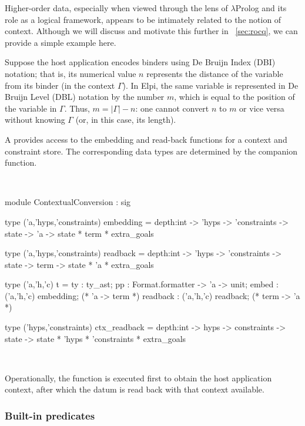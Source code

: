 \documentclass[a4paper, 11pt]{book}
\newenvironment{ocamlcode}
  {\VerbatimEnvironment~\\\begin{ocamlbox}\begin{xocamlcode}}{\end{xocamlcode}
\end{ocamlbox}\\}
\begin{document}
Higher-order data, especially when viewed through the lens of $\lambda$Prolog
and its role as a logical framework, appears to be intimately related to the
notion of context. Although we will discuss and motivate this further in
~\cref{sec:rocq}, we can provide a simple example here.

Suppose the host application encodes binders using De Bruijn Index (DBI)
notation; that is, its numerical value $n$ represents the distance of the
variable from its binder (in the context $\Gamma$). In Elpi, the same variable
is represented in De Bruijn Level (DBL) notation by the number $m$, which is
equal to the position of the variable in $\Gamma$. Thus, $m = |\Gamma| - n$:
one cannot convert $n$ to $m$ or vice versa without knowing $\Gamma$ (or, in
this case, its length).

A  provides access to the embedding and
read-back functions for a context and constraint store. The corresponding data
types are determined by the  companion function.

\begin{ocamlcode}
module ContextualConversion : sig

type ('a,'hyps,'constraints) embedding =
  depth:int -> 'hyps -> 'constraints ->
  state -> 'a -> state * term * extra_goals

type ('a,'hyps,'constraints) readback =
  depth:int -> 'hyps -> 'constraints ->
  state -> term -> state * 'a * extra_goals

type ('a,'h,'c) t = {
  ty : ty_ast;
  pp : Format.formatter -> 'a -> unit;
  embed : ('a,'h,'c) embedding;   (* 'a -> term *)
  readback : ('a,'h,'c) readback; (* term -> 'a *)
}

type ('hyps,'constraints) ctx_readback =
  depth:int -> hyps -> constraints ->
  state -> state * 'hyps * 'constraints * extra_goals
\end{ocamlcode}

\noindent
Operationally, the  function is executed first to obtain
the host application context, after which the datum is read back with that
context available.

\subsubsection{Built-in predicates}\label{sec:builtins}
\end{document}
